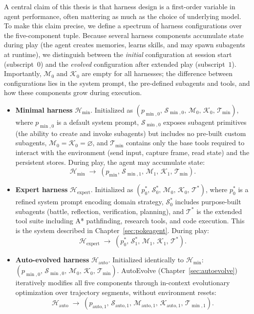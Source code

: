 A central claim of this thesis is that harness design is a first-order variable in agent performance, often mattering as much as the choice of underlying model. To make this claim precise, we define a spectrum of harness configurations over the five-component tuple. Because several harness components accumulate state during play (the agent creates memories, learns skills, and may spawn subagents at runtime), we distinguish between the \emph{initial} configuration at session start (subscript~$0$) and the \emph{evolved} configuration after extended play (subscript~$1$). Importantly, $\mathcal{M}_0$ and $\mathcal{K}_0$ are empty for all harnesses; the difference between configurations lies in the system prompt, the pre-defined subagents and tools, and how these components grow during execution.

\begin{itemize}[leftmargin=*]
    \item \textbf{Minimal harness} $\mathcal{H}_{\min}$. Initialized as $(p_{\min,0},\, \mathcal{S}_{\min,0},\, \mathcal{M}_0,\, \mathcal{K}_0,\, \mathcal{T}_{\min})$, where $p_{\min,0}$ is a default system prompt, $\mathcal{S}_{\min,0}$ exposes subagent primitives (the ability to create and invoke subagents) but includes no pre-built custom subagents, $\mathcal{M}_0 = \mathcal{K}_0 = \varnothing$, and $\mathcal{T}_{\min}$ contains only the base tools required to interact with the environment (send input, capture frame, read state) and the persistent stores. During play, the agent may accumulate state:
    \[
        \mathcal{H}_{\min} \;\longrightarrow\; (p_{\min},\, \mathcal{S}_{\min,1},\, \mathcal{M}_1,\, \mathcal{K}_1,\, \mathcal{T}_{\min}).
    \]

    \item \textbf{Expert harness} $\mathcal{H}_{\text{expert}}$. Initialized as $(p^*_0,\, \mathcal{S}^*_0,\, \mathcal{M}_0,\, \mathcal{K}_0,\, \mathcal{T}^*)$, where $p^*_0$ is a refined system prompt encoding domain strategy, $\mathcal{S}^*_0$ includes purpose-built subagents (battle, reflection, verification, planning), and $\mathcal{T}^*$ is the extended tool suite including A* pathfinding, research tools, and code execution. This is the \pokeagent{} system described in Chapter~\ref{sec:pokeagent}. During play:
    \[
        \mathcal{H}_{\text{expert}} \;\longrightarrow\; (p^*_0,\, \mathcal{S}^*_1,\, \mathcal{M}_1,\, \mathcal{K}_1,\, \mathcal{T}^*).
    \]

    \item \textbf{Auto-evolved harness} $\mathcal{H}_{\text{auto}}$. Initialized identically to $\mathcal{H}_{\min}$: $(p_{\min,0},\, \mathcal{S}_{\min,0},\, \mathcal{M}_0,\, \mathcal{K}_0,\, \mathcal{T}_{\min})$. AutoEvolve (Chapter~\ref{sec:autoevolve}) iteratively modifies all five components through in-context evolutionary optimization over trajectory segments, without environment resets:
    \[
        \mathcal{H}_{\text{auto}} \;\longrightarrow\; (p_{\text{auto},1},\, \mathcal{S}_{\text{auto},1},\, \mathcal{M}_{\text{auto},1},\, \mathcal{K}_{\text{auto},1},\, \mathcal{T}_{\min,1}).
    \]
\end{itemize}

